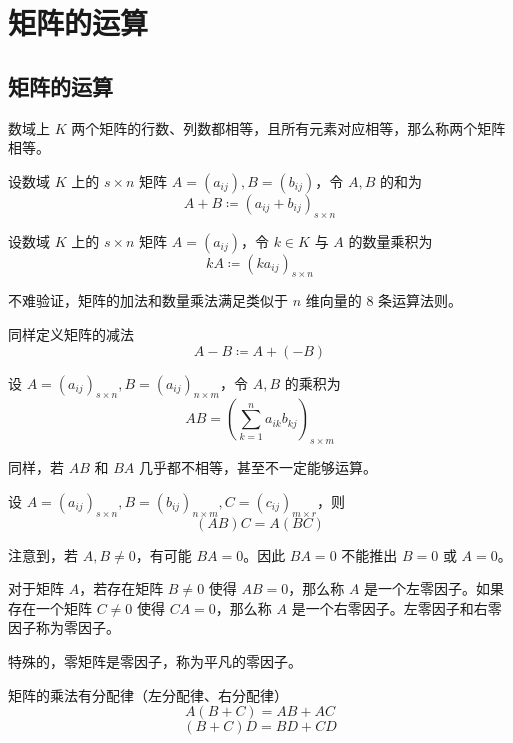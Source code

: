 \chapter{矩阵的运算}

\section{矩阵的运算}

数域上 $K$ 两个矩阵的行数、列数都相等，且所有元素对应相等，那么称两个矩阵相等。

\begin{definition}
	设数域 $K$ 上的 $s \times n$ 矩阵 $A=(a_{ij}),B=(b_{ij})$，令 $A,B$ 的和为
	\[A + B \coloneqq  (a_{ij}+b_{ij})_{s \times n}\]
\end{definition}

\begin{definition}
	设数域 $K$ 上的 $s \times n$ 矩阵 $A=(a_{ij})$，令 $k\in K$ 与 $A$ 的数量乘积为
	\[kA \coloneqq  (ka_{ij})_{s \times n}\]
\end{definition}

不难验证，矩阵的加法和数量乘法满足类似于 $n$ 维向量的 8 条运算法则。

同样定义矩阵的减法
\[A - B \coloneqq  A + (-B)\]

\begin{definition}
	设 $A=(a_{ij})_{s \times n},B=(a_{ij})_{n \times m}$，令 $A,B$ 的乘积为
	\[AB = \left(\sum_{k=1}^na_{ik}b_{kj}\right)_{s \times m}\]
\end{definition}

同样，若 $AB$ 和 $BA$ 几乎都不相等，甚至不一定能够运算。

\begin{theorem}
	设 $A = (a_{ij})_{s \times n},  B = (b_{ij})_{n \times m},C = (c_{ij})_{m \times r}$，则
	\[(AB)C = A(BC)\]
\end{theorem}

注意到，若 $A,B\ne 0$，有可能 $BA = 0$。因此 $BA = 0$ 不能推出 $B=0$ 或 $A=0$。

\begin{definition}[零因子]
	对于矩阵 $A$，若存在矩阵 $B\ne 0$ 使得 $AB = 0$，那么称 $A$ 是一个左零因子。如果存在一个矩阵 $C\ne 0$ 使得 $CA = 0$，那么称 $A$ 是一个右零因子。左零因子和右零因子称为零因子。 
\end{definition}

特殊的，零矩阵是零因子，称为平凡的零因子。

\begin{theorem}
	矩阵的乘法有分配律（左分配律、右分配律）
	\[A(B+C) = AB+AC\]
	\[(B+C)D = BD + CD\]
\end{theorem}


